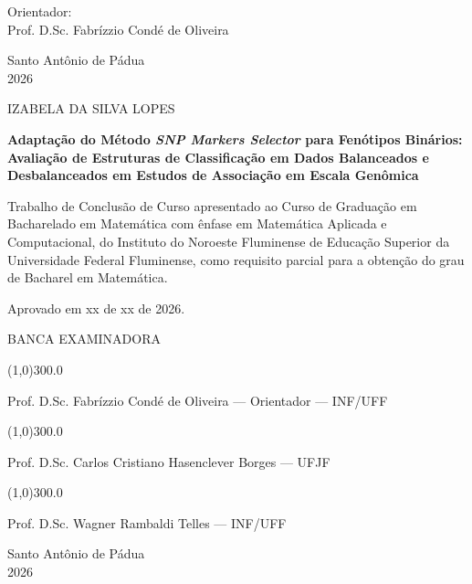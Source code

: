 \vspace{1.5cm}

\begin{center}
{Orientador: \\ Prof. D.Sc. Fabr\'{i}zzio Cond\'{e} de Oliveira}
\end{center}

\vfill
\begin{center}
Santo Ant\^{o}nio de P\'{a}dua\\ 2026
\end{center}

\clearpage


\begin{center}
{IZABELA DA SILVA LOPES}

\vspace{2.0cm}

\textbf{Adaptação do Método \emph{SNP Markers Selector} para Fenótipos Binários:
Avaliação de Estruturas de Classificação em Dados Balanceados e
Desbalanceados em Estudos de Associação em Escala Genômica}
\end{center}

\vspace{2.0cm}

\hspace{.41\textwidth}
\begin{minipage}{.5\textwidth}
    \SingleSpacing
    Trabalho de Conclus\~{a}o de Curso apresentado ao Curso de Gradua\c{c}\~{a}o
    em Bacharelado em Matem\'{a}tica com \^{e}nfase em Matem\'{a}tica Aplicada e
    Computacional, do Instituto do Noroeste Fluminense de Educa\c{c}\~{a}o
    Superior da Universidade Federal Fluminense, como requisito parcial para a
    obten\c{c}\~{a}o do grau de Bacharel em Matem\'{a}tica.
\end{minipage}%

\vspace{1.5cm}

Aprovado em xx de xx de 2026.

\begin{center}
BANCA EXAMINADORA
\end{center}

\vspace{0.5cm}

\begin{center}

\vfill

\line(1,0){300.0}

Prof. D.Sc. Fabr\'{i}zzio Cond\'{e} de Oliveira --- Orientador --- INF/UFF

\vspace{0.5cm}

\line(1,0){300.0}

Prof. D.Sc. Carlos Cristiano Hasenclever Borges --- UFJF

\vspace{0.5cm}

\line(1,0){300.0}

Prof. D.Sc. Wagner Rambaldi Telles --- INF/UFF

\end{center}

\vfill
\begin{center}
Santo Ant\^{o}nio de P\'{a}dua\\ 2026
\end{center}

\clearpage

